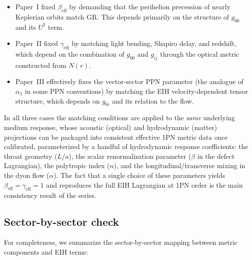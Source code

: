 \documentclass[11pt]{article}
\begin{document}
\begin{itemize}
  \item Paper~I fixed $\beta_{\text{eff}}$ by demanding that the
        perihelion precession of nearly Keplerian orbits match GR.
        This depends primarily on the structure of $g_{00}$ and its
        $U^2$ term.
  \item Paper~II fixed $\gamma_{\text{eff}}$ by matching light
        bending, Shapiro delay, and redshift, which depend on the
        combination of $g_{00}$ and $g_{ij}$ through the optical
        metric constructed from $N(r)$.
  \item Paper~III effectively fixes the vector-sector PPN parameter
        (the analogue of $\alpha_1$ in some PPN conventions) by
        matching the EIH velocity-dependent tensor structure, which
        depends on $g_{0i}$ and its relation to the flow.
\end{itemize}

In all three cases the matching conditions are applied to the
\emph{same} underlying medium response, whose acoustic (optical) and hydrodynamic
(matter) projections can be packaged into consistent effective 1PN
metric data once calibrated, parameterized by a handful of
hydrodynamic response coefficients: the throat geometry ($L/a$), the
scalar renormalization parameter ($\beta$ in the defect Lagrangian),
the polytropic index ($n$), and the longitudinal/transverse mixing in
the dyon flow ($\alpha$).
The fact that a single choice of these parameters yields
$\beta_{\text{eff}}=\gamma_{\text{eff}}=1$ and reproduces the full
EIH Lagrangian at 1PN order is the main consistency result of the
series.

\subsection{Sector-by-sector check}

For completeness, we summarize the sector-by-sector mapping between
metric components and EIH terms:
\end{document}
